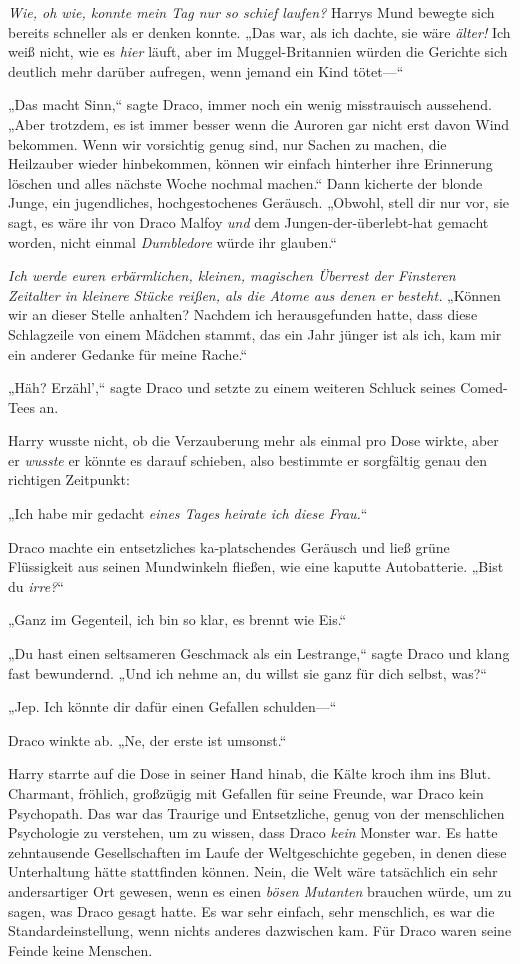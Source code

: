 {\emph{Wie, oh wie, konnte mein Tag nur so schief laufen?} Harrys Mund bewegte sich bereits schneller als er denken konnte. „Das war, als ich dachte, sie wäre \emph{älter!} Ich weiß nicht, wie es \emph{hier} läuft, aber im Muggel-Britannien würden die Gerichte sich deutlich mehr darüber aufregen, wenn jemand ein Kind tötet—“

„Das macht Sinn,“ sagte Draco, immer noch ein wenig misstrauisch aussehend. „Aber trotzdem, es ist immer besser wenn die Auroren gar nicht erst davon Wind bekommen. Wenn wir vorsichtig genug sind, nur Sachen zu machen, die Heilzauber wieder hinbekommen, können wir einfach hinterher ihre Erinnerung löschen und alles nächste Woche nochmal machen.“ Dann kicherte der blonde Junge, ein jugendliches, hochgestochenes Geräusch. „Obwohl, stell dir nur vor, sie sagt, es wäre ihr von Draco Malfoy \emph{und} dem Jungen-der-überlebt-hat gemacht worden, nicht einmal \emph{Dumbledore} würde ihr glauben.“

\emph{Ich werde euren erbärmlichen, kleinen, magischen Überrest der Finsteren Zeitalter in kleinere Stücke reißen, als die Atome aus denen er besteht.} „Können wir an dieser Stelle anhalten? Nachdem ich herausgefunden hatte, dass diese Schlagzeile von einem Mädchen stammt, das ein Jahr jünger ist als ich, kam mir ein anderer Gedanke für meine Rache.“

„Häh? Erzähl',“ sagte Draco und setzte zu einem weiteren Schluck seines Comed-Tees an.

Harry wusste nicht, ob die Verzauberung mehr als einmal pro Dose wirkte, aber er \emph{wusste} er könnte es darauf schieben, also bestimmte er sorgfältig genau den richtigen Zeitpunkt:

„Ich habe mir gedacht \emph{eines Tages heirate ich diese Frau.}“

Draco machte ein entsetzliches ka-platschendes Geräusch und ließ grüne Flüssigkeit aus seinen Mundwinkeln fließen, wie eine kaputte Autobatterie. „Bist du \emph{irre?}“

„Ganz im Gegenteil, ich bin so klar, es brennt wie Eis.“

„Du hast einen seltsameren Geschmack als ein Lestrange,“ sagte Draco und klang fast bewundernd. „Und ich nehme an, du willst sie ganz für dich selbst, was?“

„Jep. Ich könnte dir dafür einen Gefallen schulden—“

Draco winkte ab. „Ne, der erste ist umsonst.“

Harry starrte auf die Dose in seiner Hand hinab, die Kälte kroch ihm ins Blut. Charmant, fröhlich, großzügig mit Gefallen für seine Freunde, war Draco kein Psychopath. Das war das Traurige und Entsetzliche, genug von der menschlichen Psychologie zu verstehen, um zu wissen, dass Draco \emph{kein} Monster war. Es hatte zehntausende Gesellschaften im Laufe der Weltgeschichte gegeben, in denen diese Unterhaltung hätte stattfinden können. Nein, die Welt wäre tatsächlich ein sehr andersartiger Ort gewesen, wenn es einen \emph{bösen Mutanten} brauchen würde, um zu sagen, was Draco gesagt hatte. Es war sehr einfach, sehr menschlich, es war die Standardeinstellung, wenn nichts anderes dazwischen kam. Für Draco waren seine Feinde keine Menschen.

}
